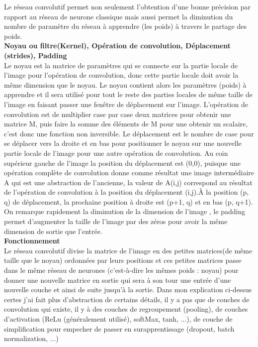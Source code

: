 Le réseau convolutif permet non seulement l'obtention d'une bonne précision par rapport au réseau de neurone classique mais aussi permet la diminution du nombre de paramètre du réseau à apprendre (les poids) à travers le partage des poids.\\

\textbf{Noyau ou filtre(Kernel), Opération de convolution, Déplacement (strides),  Padding } \cite{}\\
Le noyau est la matrice de paramètres qui se connecte sur la partie locale de l'image pour l'opération de convolution, donc cette partie locale doit avoir la même dimension que le noyau. Le noyau contient alors les paramètres (poids) à apprendre et il sera utilisé pour tout le reste des parties locales de même taille de l'image en faisant passer une fenêtre de déplacement sur l'image. L'opération de convolution est de multiplier case par case deux matrices pour obtenir une matrice M, puis faire la somme des éléments de M pour une obtenir un scalaire, c'est donc une fonction non inversible. Le déplacement est le nombre de case pour se déplacer vers la droite et en bas pour positionner le noyau sur une nouvelle partie locale de l'image pour une autre opération de convolution. Au coin supérieur gauche de l'image la position du  déplacement est (0,0), puisque une opération complète de convolution donne comme résultat une image intermédiaire A qui est une abstraction de l'ancienne, la valeur de A(i,j) correspond au résultat de l'opération de convolution à la position du déplacement (i,j).À la position (p, q) de déplacement, la prochaine position à droite est (p+1, q) et en bas (p, q+1). On remarque rapidement la diminution de la dimension de l'image , le padding permet d'augmenter la taille de l'image par des zéros pour avoir la même dimension de sortie que l'entrée.\\


\textbf{Fonctionnement}\\
Le réseau convolutif divise la matrice de l'image en des petites matrices(de même taille que le noyau) ordonnées par leurs positions et ces petites matrices passe dans le même réseau de neurones (c'est-à-dire les mêmes poids : noyau) pour donner une nouvelle matrice en sortie qui sera à son tour une entrée d'une nouvelle couche et ainsi de suite jusqu'à la sortie. Dans mon explication ci-dessus certes j'ai fait plus d'abstraction de certains détails, il y a pas que de couches de convolution qui existe, il y à des couches de regroupement (pooling), de couches d'activation (ReLu (généralement utilisé), softMax, tanh, ...), de couche de simplification pour empecher de passer en surapprentissage (dropout, batch normalization, ...) \cite{}

